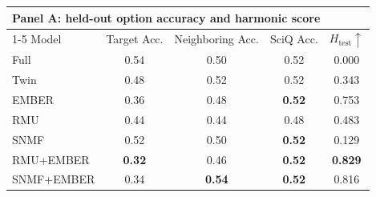 \begin{table}[h]
  \centering
  \scriptsize
  \begin{tabular}{lcccc}
    \toprule
    \multicolumn{5}{l}{\textbf{Panel A: held-out option accuracy and harmonic score}} \\
    \cmidrule(lr){1-5}
    Model & Target Acc. & Neighboring Acc. & SciQ Acc. & $H_{\mathrm{test}}\uparrow$ \\
    \midrule
    Full  & 0.54 & 0.50 & 0.52 & 0.000 \\
    Twin  & 0.48 & 0.52 & 0.52 & 0.343 \\
    EMBER & 0.36 & 0.48 & \textbf{0.52} & 0.753 \\
    RMU   & 0.44 & 0.44 & 0.48 & 0.483 \\
    SNMF  & 0.52 & 0.50 & \textbf{0.52} & 0.129 \\
    RMU+EMBER & \textbf{0.32} & 0.46 & \textbf{0.52} & \textbf{0.829} \\
    SNMF+EMBER & 0.34 & \textbf{0.54} & \textbf{0.52} & 0.816 \\
    \bottomrule
  \end{tabular}


\end{table}
